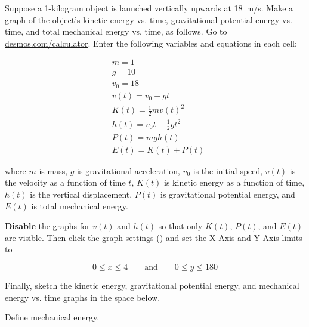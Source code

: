 \documentclass[]{exam}
\begin{document}
\begin{questions}
\question
Suppose a 1-kilogram object is launched vertically upwards at \SI{18}{m/s}. Make a graph of the object's kinetic energy vs. time, gravitational potential energy vs. time, and total mechanical energy vs. time, as follows. Go to \href{https://www.desmos.com/calculator}{desmos.com/calculator}. Enter the following variables and equations in each cell:

\begin{align*}
    & m = 1 \\[1ex]
    & g = 10 \\[1ex]
    & v_0 = 18 \\[1ex]
    & v(t) = v_0 - gt \\[1ex]
    & K(t) = \frac{1}{2} m v\left(t\right)^2 \\[1ex]
    & h(t) = v_0 t - \frac{1}{2}g t^2 \\[1ex]
    & P(t) = mg h(t) \\[1ex]
    & E(t) = K(t) + P(t)
\end{align*}

where $m$ is mass, $g$ is gravitational acceleration, $v_0$ is the initial speed, $v(t)$ is the velocity as a function of time $t$, $K(t)$ is kinetic energy as a function of time, $h(t)$ is the vertical displacement, $P(t)$ is gravitational potential energy, and $E(t)$ is total mechanical energy.

\textbf{Disable} the graphs for $v(t)$ and $h(t)$ so that only $K(t)$, $P(t)$, and $E(t)$ are visible. Then click the graph settings (\faWrench) and set the X-Axis and Y-Axis limits to

\begin{equation*}
    0 \leq x \leq 4 \qquad \text{and} \qquad
    0 \leq y \leq 180
\end{equation*}

Finally, sketch the kinetic energy, gravitational potential energy, and mechanical energy vs. time graphs in the space below.

\begin{center}
\end{center}


\question \label{2EkX0c}
Define mechanical energy.




\end{questions}
\end{document}
